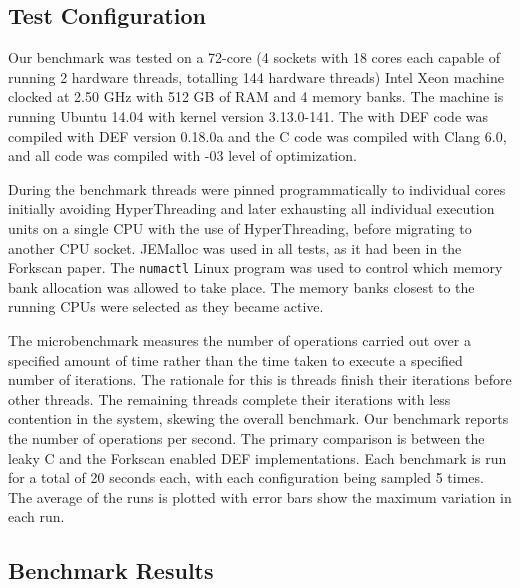\subsection{Test Configuration}

Our benchmark was tested on a 72-core (4 sockets with 18 cores each capable of running 2 hardware threads, totalling 144 hardware threads) Intel Xeon machine clocked at 2.50 GHz with 512 GB of RAM and 4 memory banks. The machine is running Ubuntu 14.04 with kernel version 3.13.0-141. The with DEF code was compiled with DEF version 0.18.0a and the C code was compiled with Clang 6.0, and all code was compiled with -03 level of optimization.

During the benchmark threads were pinned programmatically to individual cores initially avoiding HyperThreading and later exhausting all individual execution units on a single CPU with the use of HyperThreading, before migrating to another CPU socket. JEMalloc\cite{JEMalloc} was used in all tests, as it had been in the Forkscan paper.\cite{Forkscan} The \texttt{numactl} Linux program was used to control which memory bank allocation was allowed to take place. The memory banks closest to the running CPUs were selected as they became active.

The microbenchmark measures the number of operations carried out over a specified amount of time rather than the time taken to execute a specified number of iterations. The rationale for this is threads finish their iterations before other threads. The remaining threads complete their iterations with less contention in the system, skewing the overall benchmark. Our benchmark reports the number of operations per second. The primary comparison is between the leaky C and the Forkscan enabled DEF implementations. Each benchmark is run for a total of 20 seconds each, with each configuration being sampled 5 times. The average of the runs is plotted with error bars show the maximum variation in each run.

\subsection{Benchmark Results}

